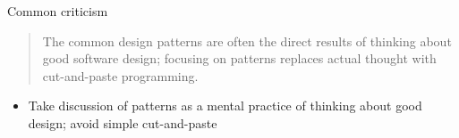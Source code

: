 \begin{frame}{Common criticism}
	\begin{quote}
		The common design patterns are often the direct results of thinking about good software design; focusing on patterns replaces actual thought with cut-and-paste programming.
	\end{quote}
	\begin{itemize}
		\item Take discussion of patterns as a mental practice of thinking about good design; avoid simple cut-and-paste
	\end{itemize}
\end{frame}
